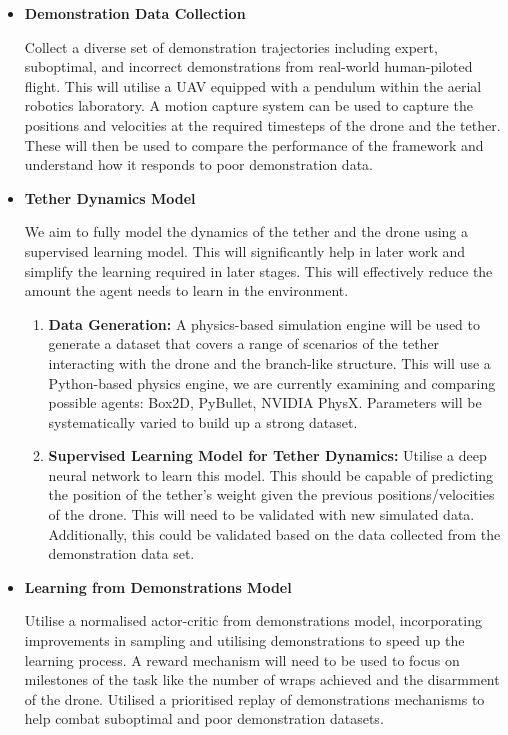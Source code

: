 \begin{itemize}
  \item \textbf{Demonstration Data Collection}
  
  Collect a diverse set of demonstration trajectories including expert, suboptimal, and incorrect demonstrations from real-world human-piloted flight.
  This will utilise a UAV equipped with a pendulum within the aerial robotics laboratory.
  A motion capture system can be used to capture the positions and velocities at the required timesteps of the drone and the tether.
  These will then be used to compare the performance of the framework and understand how it responds to poor demonstration data.

  \item \textbf{Tether Dynamics Model}
  
  We aim to fully model the dynamics of the tether and the drone using a supervised learning model.
  This will significantly help in later work and simplify the learning required in later stages.
  This will effectively reduce the amount the agent needs to learn in the environment.

  \begin{enumerate}
    \item \textbf{Data Generation: } 
    A physics-based simulation engine will be used to generate a dataset that covers a range of scenarios of the tether interacting with the drone and the branch-like structure.
    This will use a Python-based physics engine, we are currently examining and comparing possible agents: Box2D, PyBullet, NVIDIA PhysX.
    Parameters will be systematically varied to build up a strong dataset.

    \item \textbf{Supervised Learning Model for Tether Dynamics: }
    Utilise a deep neural network to learn this model.
    This should be capable of predicting the position of the tether's weight given the previous positions/velocities of the drone.
    This will need to be validated with new simulated data.
    Additionally, this could be validated based on the data collected from the demonstration data set.
  \end{enumerate}

  \item \textbf{Learning from Demonstrations Model}
  
  Utilise a normalised actor-critic from demonstrations model, incorporating improvements in sampling and utilising demonstrations to speed up the learning process.
  A reward mechanism will need to be used to focus on milestones of the task like the number of wraps achieved and the disarmment of the drone.
  Utilised a prioritised replay of demonstrations mechanisms to help combat suboptimal and poor demonstration datasets.


\end{itemize}
